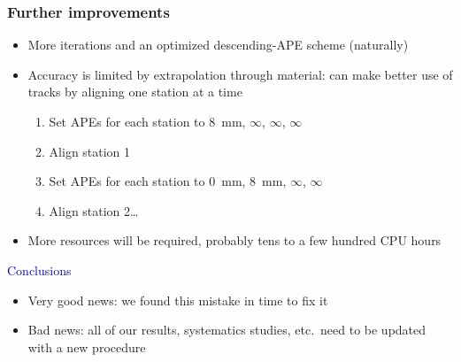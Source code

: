 \documentclass[compress]{beamer}
\begin{document}
\begin{frame}
\frametitle{Further improvements}
\begin{itemize}
\item More iterations and an optimized descending-APE scheme (naturally)

\item Accuracy is limited by extrapolation through material: can make
better use of tracks by aligning one station at a time
\begin{enumerate}
\item Set APEs for each station to 8~mm, $\infty$, $\infty$, $\infty$
\item Align station 1
\item Set APEs for each station to 0~mm, 8~mm, $\infty$, $\infty$
\item Align station 2\ldots
\end{enumerate}

\item More resources will be required, probably tens to a few hundred CPU hours
\end{itemize}

\vfill
\hspace{-0.83 cm} \textcolor{darkblue}{\Large Conclusions}
\begin{itemize}
\item Very good news: we found this mistake in time to fix it
\item Bad news: all of our results, systematics studies, etc.\ need to be updated with a new procedure
\end{itemize}
\label{numpages}
\end{frame}
\end{document}
